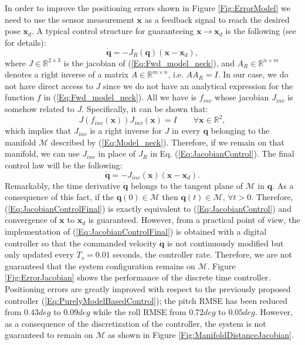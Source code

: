 \documentclass[conference]{IEEEtran}
\numberwithin{equation}{section}
\newcommand{\q}{\mathbf{q}}
\newcommand{\x}{\mathbf{x}}
\begin{document}
In order to improve the positioning errors shown in Figure \ref{Fig:ErrorModel} we need to use the sensor measurement $\x$ as a feedback signal to reach the desired pose $\x_d$. A typical control structure for guaranteeing $\x \rightarrow \x_d$ is the following (see \cite{SamsonEspiau} for details):
\begin{equation} \label{Eq:JacobianControl}
\dot{\q} = - J_R(\q) (\x - \x_d),
\end{equation}
where $J \in \mathbb R^{2 \times 3}$ is the jacobian of (\ref{Eq:Fwd_model_neck}), and $A_R \in \mathbb R^{n \times m}$ denotes a right inverse of a matrix $A \in \mathbb R^{m \times n}$, i.e. $A A_R = I$. In our case, we do not have direct access to $J$ since we do not have an analytical expression for the function $f$ in (\ref{Eq:Fwd_model_neck}). All we have is $f_{inv}$ whose jacobian $J_{inv}$ is somehow related to $J$. Specifically, it can be shown that:
\begin{equation} \label{Eq:JacobianInv}
J(f_{inv}(\x)) J_{inv} (\x) = I \qquad \forall \x \in \mathbb R^2,
\end{equation}
which implies that $J_{inv}$ is a right inverse for  $J$ in every $\q$ belonging to the manifold $\mathcal M$ described by (\ref{Eq:Model_neck}). Therefore, if we remain on that manifold, we can use $J_{inv}$ in place of $J_R$ in Eq. (\ref{Eq:JacobianControl}). The final control law will be the following:
\begin{equation} \label{Eq:JacobianControlFinal}
\dot{\q} = - J_{inv}(\x) (\x - \x_d).
\end{equation}
Remarkably, the time derivative $\dot{\q}$ belongs to the tangent plane of $\mathcal M$ in $\mathbf q$. As a consequence of this fact, if the $\q(0) \in \mathcal M$ then $\q(t) \in \mathcal M$, $\forall t > 0$. Therefore, (\ref{Eq:JacobianControlFinal}) is exactly equivalent to (\ref{Eq:JacobianControl}) and convergence of $\x$ to $\x_d$ is guaranteed. However, from a practical point of view, the implementation of (\ref{Eq:JacobianControlFinal}) is obtained with a digital controller so that the commanded velocity $\dot{\q}$ is not continuously modified but only updated every $T_s = 0.01$ seconds, the controller rate. Therefore, we are not guaranteed that the system configuration remains on $\mathcal{M}$. Figure \ref{Fig:ErrorJacobian} shows the performance of the discrete time controller. Positioning errors are greatly improved with respect to the previously proposed controller (\ref{Eq:PurelyModelBasedControl}); the pitch RMSE has been reduced from $0.43deg$ to $0.09deg$ while the roll RMSE from $0.72deg$ to $0.05deg$. However, as a consequence of the discretization of the controller, the system is not guaranteed to remain on $\mathcal M$ as shown in Figure \ref{Fig:ManifoldDistanceJacobian}. 
\end{document}
